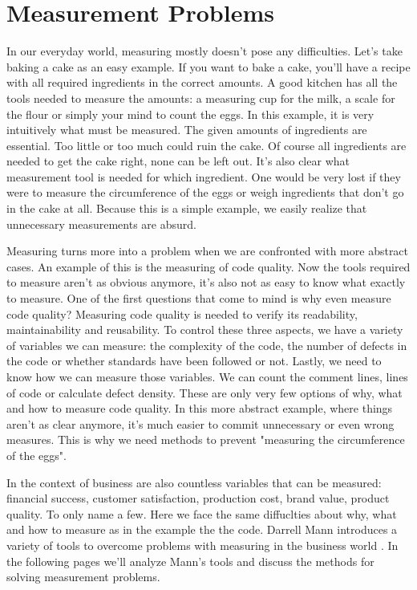 \chapter{Measurement Problems}

In our everyday world, measuring mostly doesn't pose any difficulties.
Let's take baking a cake as an easy example.
If you want to bake a cake, you'll have a recipe with all required ingredients in the correct amounts.
A good kitchen has all the tools needed to measure the amounts: a measuring cup for the milk, a scale for the flour or simply your mind to count the eggs.
In this example, it is very intuitively what must be measured.
The given amounts of ingredients are essential. 
Too little or too much could ruin the cake.
Of course all ingredients are needed to get the cake right, none can be left out.
It's also clear what measurement tool is needed for which ingredient.
One would be very lost if they were to measure the circumference of the eggs or weigh ingredients that don't go in the cake at all.
Because this is a simple example, we easily realize that unnecessary measurements are absurd.

Measuring turns more into a problem when we are confronted with more abstract cases.
An example of this is the measuring of code quality.
Now the tools required to measure aren't as obvious anymore, it's also not as easy to know what exactly to measure.
One of the first questions that come to mind is why even measure code quality?
Measuring code quality is needed to verify its readability, maintainability and reusability.
To control these three aspects, we have a variety of variables we can measure: the complexity of the code, the number of defects in the code or whether standards have been followed or not.
Lastly, we need to know how we can measure those variables. 
We can count the comment lines, lines of code or calculate defect density.
These are only very few options of why, what and how to measure code quality.
In this more abstract example, where things aren't as clear anymore, it's much easier to commit unnecessary or even wrong measures.
This is why we need methods to prevent "measuring the circumference of the eggs".

In the context of business are also countless variables that can be measured: financial success, customer satisfaction, production cost, brand value, product quality.
To only name a few.
Here we face the same diffuclties about why, what and how to measure as in the example the the code.
Darrell Mann introduces a variety of tools to overcome problems with measuring in the business world \cite{darrell2004hands}.
In the following pages we'll analyze Mann's tools and discuss the methods for solving measurement problems.
















